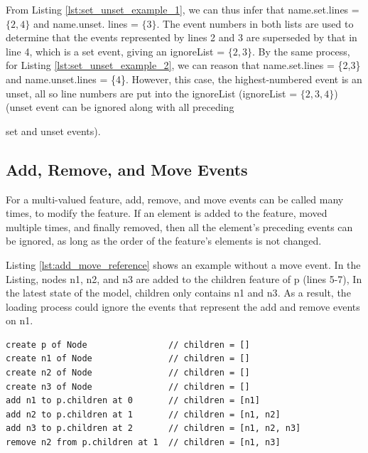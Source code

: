From Listing \ref{lst:set_unset_example_1}, we can thus infer that \textsf{name}.\textsf{set}.\textsf{lines} = $\{2,4\}$ and \textsf{name}.\textsf{unset}. \textsf{lines} = $\{3\}$. The event numbers in both lists are used to determine that the events represented by lines 2 and 3 are superseded by that in line 4, which is a \textsf{set} event, giving an \textsf{ignoreList} = $\{2, 3\}$.  By the same process, for Listing \ref{lst:set_unset_example_2}, we can reason that \textsf{name}.\textsf{set}.\textsf{lines} = \{2,3\} and \textsf{name}.\textsf{unset}.\textsf{lines} = \{4\}.  However, this case, the highest-numbered event is an \textsf{unset}, all so line numbers are put into the ignoreList (\textsf{ignoreList} = $\{2, 3, 4\}$) (\textsf{unset} event can be ignored along with all preceding {\textsf{set} and \textsf{unset} events). 

\subsection{Add, Remove, and Move Events}\label{subsec:add_remove_and_move_operations}
For a multi-valued feature, add, remove, and move events can be called many times, to modify the feature. If an element is added to the feature, moved multiple times, and finally removed, then all the element's preceding events can be ignored, as long as the order of the feature's elements is not changed. 

Listing \ref{lst:add_move_reference} shows an example without a \textsf{move} event. In the Listing, nodes \textsf{n1}, \textsf{n2}, and \textsf{n3} are added to the \textsf{children} feature of \textsf{p} (lines 5-7), In the latest state of the model, \textsf{children} only contains \textsf{n1} and \textsf{n3}. As a result, the loading process could ignore the events that represent the \textsf{add} and \textsf{remove} events on \textsf{n1}. 

\vspace{-20pt}
\begin{lstlisting}[style=eol,caption={A CBP of add and remove operations.},label=lst:add_move_reference]
create p of Node                // children = []
create n1 of Node               // children = []
create n2 of Node               // children = []
create n3 of Node               // children = []
add n1 to p.children at 0       // children = [n1]
add n2 to p.children at 1       // children = [n1, n2]
add n3 to p.children at 2       // children = [n1, n2, n3]
remove n2 from p.children at 1  // children = [n1, n3]   
\end{lstlisting}

}
